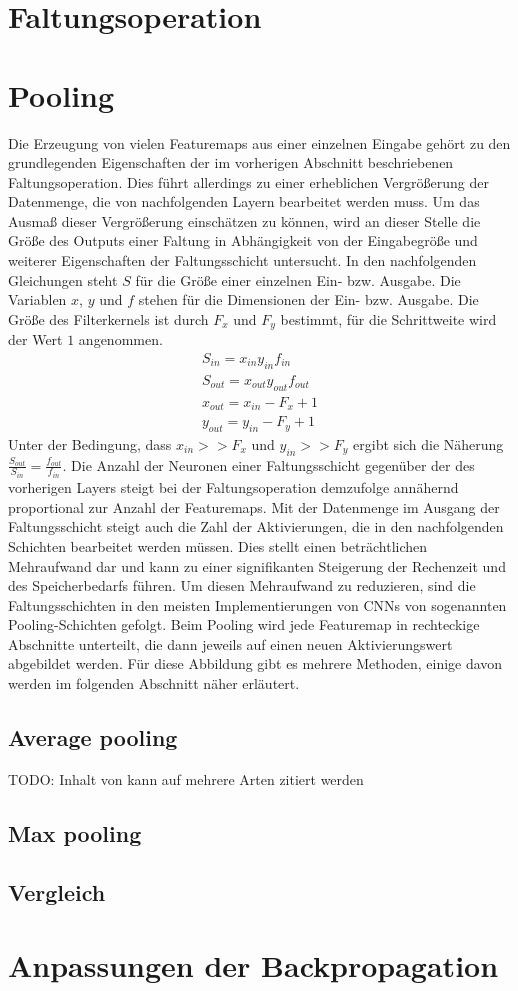 \documentclass[../main.tex]{subfiles}
\begin{document}
\section{Faltungsoperation}
\section{Pooling}
Die Erzeugung von vielen Featuremaps aus einer einzelnen Eingabe gehört zu den grundlegenden Eigenschaften der im vorherigen Abschnitt beschriebenen Faltungsoperation. Dies führt allerdings zu einer erheblichen Vergrößerung der Datenmenge, die von nachfolgenden Layern bearbeitet werden muss. Um das Ausmaß dieser Vergrößerung einschätzen zu können, wird an dieser Stelle die Größe des Outputs einer Faltung in Abhängigkeit von der Eingabegröße und weiterer Eigenschaften der Faltungsschicht untersucht. 
In den nachfolgenden Gleichungen steht \(S\) für die Größe einer einzelnen Ein- bzw. Ausgabe. Die Variablen \(x\), \(y\) und \(f\) stehen für die Dimensionen der Ein- bzw. Ausgabe. Die Größe des Filterkernels ist durch \(F_x\) und \(F_y\) bestimmt, für die Schrittweite wird der Wert \(1\) angenommen. 
\begin{equation}
\begin{split}
S_{in} = x_{in} y_{in} f_{in}\\
S_{out} = x_{out} y_{out} f_{out}\\
x_{out} = x_{in} - F_x + 1\\
y_{out} = y_{in} - F_y + 1
\end{split}
\end{equation}
Unter der Bedingung, dass \(x_{in} >> F_x\) und \(y_{in} >> F_y\) ergibt sich die Näherung \(\frac{S_{out}}{S_{in}} = \frac{f_{out}}{f_{in}}\). Die Anzahl der Neuronen einer Faltungsschicht gegenüber der des vorherigen Layers steigt bei der Faltungsoperation demzufolge annähernd proportional zur Anzahl der Featuremaps. 
Mit der Datenmenge im Ausgang der Faltungsschicht steigt auch die Zahl der Aktivierungen, die in den nachfolgenden Schichten bearbeitet werden müssen. Dies stellt einen beträchtlichen Mehraufwand dar und kann zu einer signifikanten Steigerung der Rechenzeit und des Speicherbedarfs führen. Um diesen Mehraufwand zu reduzieren, sind die Faltungsschichten in den meisten Implementierungen von CNNs von sogenannten Pooling-Schichten gefolgt. Beim Pooling wird jede Featuremap in rechteckige Abschnitte unterteilt, die dann jeweils auf einen neuen Aktivierungswert abgebildet werden. Für diese Abbildung gibt es mehrere Methoden, einige davon werden im folgenden Abschnitt näher erläutert. 
\subsection{Average pooling}
TODO: Inhalt von \cite{paperMixedPooling} kann auf mehrere Arten zitiert werden \parencite[368]{paperMixedPooling}
\subsection{Max pooling}

\subsection{Vergleich}

\section{Anpassungen der Backpropagation}
\end{document}
